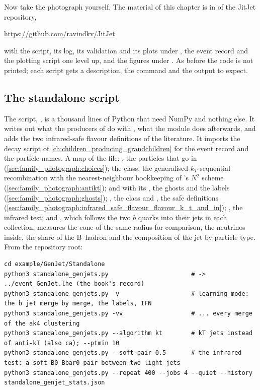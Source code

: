 Now take the photograph yourself. The material of this chapter is in
 of the JitJet repository,
\begin{center}
  \url{https://github.com/ravindkv/JitJet}
\end{center}
with the script, its log, its validation and its plots under
, the event record and the plotting
script one level up, and the \CMSSW figures under
. As before the code is not printed; each
script gets a description, the command and the output to expect.

\subsection{The standalone script}

The script, , is a thousand lines of Python
that need NumPy and nothing else. It writes out what the 
producers of \CMSSW do with \FASTJET, what the 
module does afterwards, and adds the two infrared-safe flavour
definitions of the literature. It imports the decay script of
\cref{ch:children_producing_grandchildren} for the event record and the
particle names. A map of the file: , the particles
that go in (\cref{sec:family_photograph:choices}); the 
class, the generalised-$k_T$ sequential recombination with the
nearest-neighbour bookkeeping of \FASTJET's $N^2$ scheme
(\cref{sec:family_photograph:antikt});  and
 with its , the ghosts and the \CMSSW
labels (\cref{sec:family_photograph:ghosts}); ,
the  class and , the safe definitions
(\cref{sec:family_photograph:infrared_safe_flavour_flavour_k_t_and_in});
, the infrared test; and , which
follows the two $b$ quarks into their jets in each collection, measures
the cone of the same radius for comparison, the neutrinos inside, the
share of the B~hadron and the composition of the jet by particle type.
From the repository root:
\begin{verbatim}
cd example/GenJet/Standalone
python3 standalone_genjets.py                       # -> ../event_GenJet.lhe (the book's record)
python3 standalone_genjets.py -v                    # learning mode: the b jet merge by merge, the labels, IFN
python3 standalone_genjets.py -vv                   # ... every merge of the ak4 clustering
python3 standalone_genjets.py --algorithm kt        # kT jets instead of anti-kT (also ca); --ptmin 10
python3 standalone_genjets.py --soft-pair 0.5       # the infrared test: a soft B0 Bbar0 pair between two light jets
python3 standalone_genjets.py --repeat 400 --jobs 4 --quiet --history standalone_genjet_stats.json
\end{verbatim}
